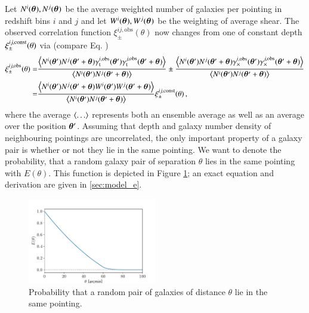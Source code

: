 Let $N^i(\b \theta),N^j(\b\theta)$ be the average weighted number of galaxies per pointing in redshift bins $i$ and $j$ and let $W^i(\b \theta),W^j(\b\theta)$ be the weighting of average shear. The observed correlation function $\xi^{ij,\text{obs}}_\pm(\theta)$ now changes from one of constant depth $\xi_\pm^{ij,\rm{const}}(\theta)$ via (compare Eq. )
\begin{align}
\xi^{ij,\text{obs}}_\pm(\theta) = & \frac{\la N^i(\bth)N^j(\bthp)\gamma^{i,\rm{obs}}_{\rm t}(\bth)\gamma^{j,\rm{obs}}_{\rm t}(\bthp)\ra }{\la N^i(\bth)N^j(\bthp)\ra} \pm \frac{\la N^i(\bth)N^j(\bthp)\gamma^{i,\rm{obs}}_\times(\bth)\gamma^{j,\rm{obs}}_\times(\bthp)\ra }{\la N^i(\bth)N^j(\bthp)\ra} \nonumber\\
 = & \frac{\la N^i(\bth)N^j(\bthp)W^i(\bth)W^j(\bthp)\ra}{\la N^i(\bth)N^j(\bthp)\ra} \xi_{\pm}^{ij,\rm{const}}(\theta) \, ,
 \label{eq:xipmblub1}
 \end{align}
 where the average $\la\ldots\ra$ represents both an ensemble average as well as an average over the position $\bth$.
 Assuming that depth and galaxy number density of neighbouring pointings are uncorrelated, the only important property of a galaxy pair is whether or not they lie in the same pointing. We want to denote the probability, that a random galaxy pair of separation $\theta$ lies in the same pointing with $E(\theta)$. This function is depicted in Figure \ref{fig:eoftheta_lin}; an exact equation and derivation are given in \ref{sec:model_e}.
 
\begin{figure}
 \centering
 \includegraphics[width=0.5\textwidth]{images/eoftheta.pdf}
 \caption{Probability that a random pair of galaxies of distance $\theta$ lie in the same pointing.}
 \label{fig:eoftheta_lin}
\end{figure}

